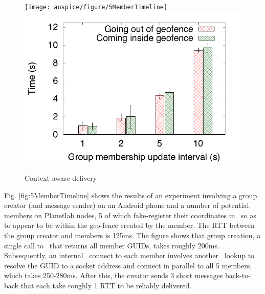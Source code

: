 \begin{figure}[t]
\begin{center}
\vspace{-0.8in}
{\texttt{[image: auspice/figure/5MemberTimeline]}
\label{fig:5MemberTimeline}
}
\vspace{-1.5in}
{
\includegraphics[scale=0.3]{auspice/figure/geoCastStaleness}
\label{fig:geoCastStaleness}
}
\vspace{-0.85in}
\caption{Context-aware delivery}
\vspace{-0.2in}
\end{center}
\end{figure}

%

Fig. \ref{fig:5MemberTimeline} shows the results of an experiment involving a group creator (and message sender) on an Android phone and a number of potential members on Planetlab nodes, 5 of which fake-register their coordinates in \auspice\ so as to appear to be within the geo-fence created by the member. The RTT between the group creator and members is 125ms. The figure shows that group creation, a single call to \auspice\ that returns all member GUIDs, takes roughly 200ms. Subsequently, an internal \msocket\ connect to each member involves another \auspice\ lookup to resolve the GUID to a socket address and connect in parallel to all 5 members, which takes 250-280ms. After this, the creator sends 3 short messages back-to-back that each take roughly 1 RTT to be reliably delivered.


